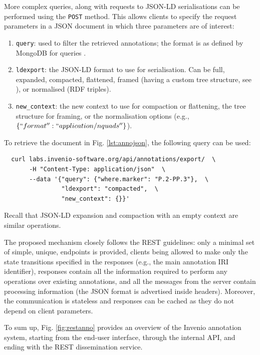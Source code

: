 More complex queries, along with requests to JSON-LD serialisations can be
performed using the \texttt{POST} method. This allows clients to specify the
request parameters in a JSON document in which three parameters are of interest:
\begin{enumerate}
  \item \texttt{query}: used to filter the retrieved annotations; the format is
                        as defined by MongoDB for queries \cite{ref:mongo}.
  \item \texttt{ldexport}: the JSON-LD format to use for serialisation. Can be
                           full, expanded, compacted, flattened, framed (having
                           a custom tree structure, see \cite{ref:jsonldframe}),
                           or normalised (RDF triples).
  \item \texttt{new\_context}: the new context to use for compaction or
                               flattening, the tree structure for framing, or
                               the normalisation options (e.g.,
                               $\{``format'': ``application/nquads''\}$).
\end{enumerate}

\newpage

To retrieve the document in Fig. \ref{lst:annojson}, the following
query can be used:
\begin{verbatim}
  curl labs.invenio-software.org/api/annotations/export/  \
       -H "Content-Type: application/json"  \
       --data '{"query": {"where.marker": "P.2-PP.3"},  \
                "ldexport": "compacted",  \
                "new_context": {}}'
\end{verbatim}
Recall that JSON-LD expansion and compaction with an empty context are similar
operations.

The proposed mechanism closely follows the REST guidelines: only a minimal set
of simple, unique, endpoints is provided, clients being allowed to make only
the state transitions specified in the responses (e.g., the main annotation IRI
identifier), responses contain all the information required to perform any
operations over existing annotations, and all the messages from the server
contain processing information (the JSON format is advertised inside headers).
Moreover, the communication is stateless and responses can be cached as they do
not depend on client parameters.

To sum up, Fig. \ref{fig:restanno} provides an overview of the Invenio
annotation system, starting from the end-user interface, through the internal
API, and ending with the REST dissemination service.

